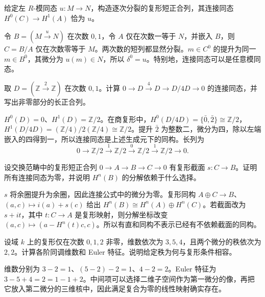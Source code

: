 \begin{exercise}\label{b4:ex:05-prescribed-connecting}
给定左 \(R\)-模同态 \(u:M\to N\)，构造逐次分裂的复形短正合列，其连接同态 \(H^0(C)\to H^1(A)\) 恰为 \(u\)。
\end{exercise}
\begin{solution}
令 \(B=(M\xrightarrow{u}N)\) 在次数 \(0,1\)，令 \(A\) 仅在次数一等于 \(N\)，并嵌入 \(B\)，则 \(C=B/A\) 仅在次数零等于 \(M\)。两次数的短列都显然分裂。\(m\in C^0\) 的提升为同一 \(m\in B^0\)，其微分为 \(u(m)\in N\)，所以 \(\delta^0=u\)。特别地，连接同态可以是任意模同态。
\end{solution}

\begin{exercise}\label{b4:ex:05-modfour-connecting}
取 \(D=(\mathbb Z\xrightarrow{2}\mathbb Z)\) 在次数 \(0,1\)。计算 \(0\to D\xrightarrow{4}D\to D/4D\to0\) 的连接同态，并写出非零部分的长正合列。
\end{exercise}
\begin{solution}
\(H^0(D)=0\)、\(H^1(D)=\mathbb Z/2\)。在商复形中，\(H^0(D/4D)=\{\bar0,\bar2\}\cong\mathbb Z/2\)，\(H^1(D/4D)=(\mathbb Z/4)/2(\mathbb Z/4)\cong\mathbb Z/2\)。提升 \(\bar2\) 为整数二，微分为四，除以左端嵌入的四得到一，所以连接同态是上述生成元下的同构。长列为
\[
0\to\mathbb Z/2\xrightarrow{1}\mathbb Z/2
\xrightarrow{0}\mathbb Z/2\xrightarrow{1}\mathbb Z/2\to0.
\]
\end{solution}

\begin{exercise}\label{b4:ex:05-split-complex-les}
设交换范畴中的复形短正合列 \(0\to A\to B\to C\to0\) 有复形截面 \(s:C\to B\)。证明所有连接同态为零，并说明 \(H^n(B)\) 的分解依赖于什么选择。
\end{exercise}
\begin{solution}
\(s\) 将余圈提升为余圈，因此连接公式中的微分为零。复形同构 \(A\oplus C\to B\)、\((a,c)\mapsto i(a)+s(c)\) 给出 \(H^n(B)\cong H^n(A)\oplus H^n(C)\)。若截面改为 \(s+i t\)，其中 \(t:C\to A\) 是复形映射，则分解坐标改变 \((a,c)\mapsto(a-H^n(t)c,c)\)。所以有直和同构不表示已经有不依赖截面的同构。
\end{solution}

\begin{exercise}\label{b4:ex:05-euler-ranks}
设域 \(k\) 上的复形仅在次数 \(0,1,2\) 非零，维数依次为 \(3,5,4\)，且两个微分的秩依次为 \(2,2\)。计算各阶同调维数和 Euler 特征。说明给定秩为何与复形条件相容。
\end{exercise}
\begin{solution}
维数分别为 \(3-2=1\)、\((5-2)-2=1\)、\(4-2=2\)。Euler 特征为 \(3-5+4=2=1-1+2\)。中间项可以选择二维子空间作为第一微分的像，再把它放入第二微分的三维核中，因此满足复合为零的线性映射确实存在。
\end{solution}

